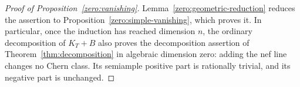 \begin{proof}[Proof of Proposition~\ref{zero:vanishing}]
Lemma~\ref{zero:geometric-reduction} reduces the assertion to
Proposition~\ref{zero:simple-vanishing}, which proves it.
In particular, once the induction has reached dimension \(n\), the
ordinary decomposition of \(K_T+B\) also proves the decomposition
assertion of Theorem~\ref{thm:decomposition} in algebraic dimension
zero: adding the nef line changes no Chern class.  Its semiample positive
part is rationally trivial, and its negative part is unchanged.
\end{proof}
